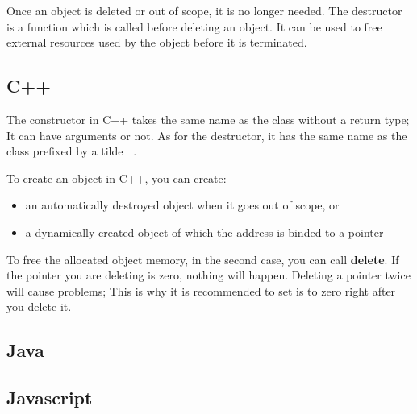 \documentclass{KodeBook}
\begin{document}
Once an object is deleted or out of scope, it is no longer needed. 
The destructor is a function which is called before deleting an object.
It can be used to free external resources used by the object before it is terminated.

\subsection{C++}

The constructor in C++ takes the same name as the class without a return type;
It can have arguments or not.
As for the destructor, it has the same name as the class prefixed by a tilde \textbf{~}.



To create an object in C++, you can create:
\begin{itemize}
	\item an automatically destroyed object when it goes out of scope, or
	\item a dynamically created object of which the address is binded to a pointer
\end{itemize}



To free the allocated object memory, in the second case, you can call \textbf{delete}. 
If the pointer you are deleting is zero, nothing will happen. 
Deleting a pointer twice will cause problems; This is why it is recommended to set is to zero right after you delete it.



\subsection{Java}







\subsection{Javascript}
\end{document}
